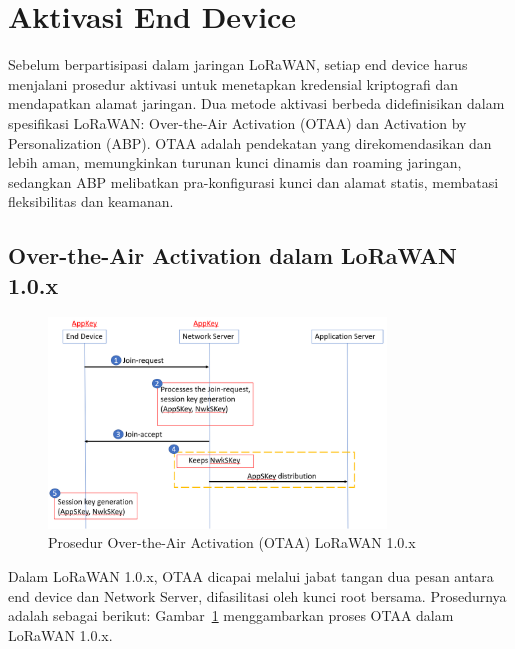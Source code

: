 \section{Aktivasi End Device}
Sebelum berpartisipasi dalam jaringan LoRaWAN, setiap end device harus menjalani prosedur aktivasi untuk menetapkan kredensial kriptografi dan mendapatkan alamat jaringan. Dua metode aktivasi berbeda didefinisikan dalam spesifikasi LoRaWAN: Over-the-Air Activation (OTAA) dan Activation by Personalization (ABP). OTAA adalah pendekatan yang direkomendasikan dan lebih aman, memungkinkan turunan kunci dinamis dan roaming jaringan, sedangkan ABP melibatkan pra-konfigurasi kunci dan alamat statis, membatasi fleksibilitas dan keamanan.
\subsection{Over-the-Air Activation dalam LoRaWAN 1.0.x}
\begin{figure}[htbp]
    \centering
    \includegraphics[width=0.8\textwidth]{figures/otaa-lorawan1.0.png}
    \caption{Prosedur Over-the-Air Activation (OTAA) LoRaWAN 1.0.x}
    \label{fig:lora_otaa_1.0}
\end{figure}
Dalam LoRaWAN 1.0.x, OTAA dicapai melalui jabat tangan dua pesan antara end device dan Network Server, difasilitasi oleh kunci root bersama. Prosedurnya adalah sebagai berikut:
Gambar~\ref{fig:lora_otaa_1.0} menggambarkan proses OTAA dalam LoRaWAN 1.0.x.
